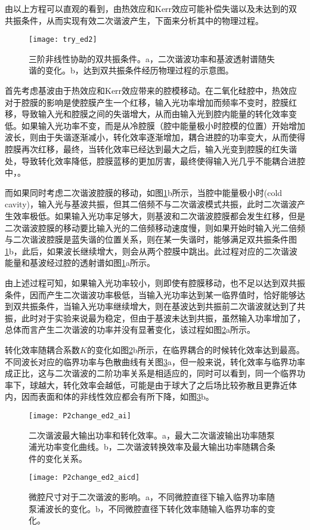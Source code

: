 由以上方程可以直观的看到，由热效应和Kerr效应可能补偿失谐以及未达到的双共振条件，从而实现有效二次谐波产生，下面来分析其中的物理过程。

\begin{figure}
\centering
\texttt{[image: try\_ed2]}
\caption{三阶非线性协助的双共振条件。a，二次谐波功率和基波透射谱随失谐的变化。b，达到双共振条件经历物理过程的示意图。}
\label{pic:try_ed2}
\end{figure}

首先考虑基波由于热效应和Kerr效应带来的腔模移动。在二氧化硅腔中，热效应对于腔膜的影响是使腔膜产生一个红移，输入光功率增加而频率不变时，腔膜红移，导致输入光和腔膜之间的失谐增大，从而由输入光到腔内能量的转化效率变低。如果输入光功率不变，而是从冷腔膜（腔中能量极小时腔模的位置）开始增加波长，则由于失谐逐渐减小，转化效率逐渐增加，耦合进腔的功率变大，从而使得腔膜再次红移，最终，当转化效率已经达到最大之后，输入光变到腔膜的红失谐处，导致转化效率降低，腔膜蓝移的更加厉害，最终使得输入光几乎不能耦合进腔中\cite{carmon2004dynamical}，。

而如果同时考虑二次谐波腔膜的移动，如图\ref{pic:try_ed2}b所示，当腔中能量极小时(cold cavity)，输入光与基波共振，但其二倍频不与二次谐波模式共振，此时二次谐波产生效率极低。如果输入光功率足够大，则基波和二次谐波腔膜都会发生红移，但是二次谐波腔膜的移动要比输入光的二倍频移动速度慢，则如果开始时输入光二倍频与二次谐波腔膜是蓝失谐的位置关系，则在某一失谐时，能够满足双共振条件图\ref{pic:try_ed2}b，此后，如果波长继续增大，则会从两个腔膜中跳出。此过程对应的二次谐波能量和基波经过腔的透射谱如图\ref{pic:try_ed2}a所示。

由上述过程可知，如果输入光功率较小，则即使有腔膜移动，也不足以达到双共振条件，因而产生二次谐波功率极低，当输入光功率达到某一临界值时，恰好能够达到双共振条件，当输入光功率继续增大，则在基波达到共振前二次谐波就达到了共振，此时对于实验来说最为稳定，但由于基波未达到共振，虽然输入功率增加了，总体而言产生二次谐波的功率并没有显著变化，该过程如图\ref{pic:P2change_ed2_ai}a所示。

转化效率随耦合系数$K$的变化如图\ref{pic:P2change_ed2_ai}b所示，在临界耦合的时候转化效率达到最高。不同波长对应的临界功率与色散曲线有关图\ref{pic:P2change_ed2_aicd}a，但一般来说，转化效率与临界功率成正比，这与二次谐波的二阶功率关系是相适应的，同时可以看到，同一个临界功率下，球越大，转化效率会越低，可能是由于球大了之后场比较弥散且更靠近体内，因而表面和体的非线性效应都会有所下降，如图\ref{pic:P2change_ed2_aicd}b。
\begin{figure}
\texttt{[image: P2change\_ed2\_ai]}
\centering
\caption{二次谐波最大输出功率和转化效率。a，最大二次谐波输出功率随泵浦光功率变化曲线。b，二次谐波转换效率及最大输出功率随耦合条件的变化关系。}
\label{pic:P2change_ed2_ai}
\end{figure}

\begin{figure}
\texttt{[image: P2change\_ed2\_aicd]}
\centering
\caption{微腔尺寸对于二次谐波的影响。a，不同微腔直径下输入临界功率随泵浦波长的变化。b，不同微腔直径下转化效率随输入临界功率的变化。}
\label{pic:P2change_ed2_aicd}
\end{figure}